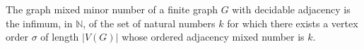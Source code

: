 The graph mixed minor number of a finite graph \(G\) with decidable adjacency
is the infimum, in \(\mathbb{N}\), of the set of natural numbers \(k\) for
which there exists a vertex order \(\sigma\) of length \(|V(G)|\) whose
ordered adjacency mixed number is \(k\).
